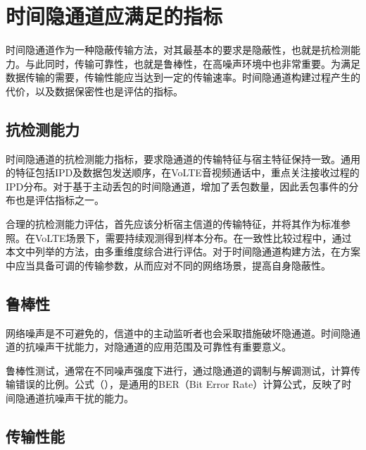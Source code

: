 \section{时间隐通道应满足的指标}
\label{chap:backinfo:metric}

时间隐通道作为一种隐蔽传输方法，对其最基本的要求是隐蔽性，也就是抗检测能力。与此同时，传输可靠性，也就是鲁棒性，在高噪声环境中也非常重要。为满足数据传输的需要，传输性能应当达到一定的传输速率。时间隐通道构建过程产生的代价，以及数据保密性也是评估的指标。

\subsection{抗检测能力}
\label{chap:backinfo:metric:undetectability}

时间隐通道的抗检测能力指标，要求隐通道的传输特征与宿主特征保持一致。通用的特征包括IPD及数据包发送顺序，在VoLTE音视频通话中，重点关注接收过程的IPD分布。对于基于主动丢包的时间隐通道，增加了丢包数量，因此丢包事件的分布也是评估指标之一。

合理的抗检测能力评估，首先应该分析宿主信道的传输特征，并将其作为标准参照。在VoLTE场景下，需要持续观测得到样本分布。在一致性比较过程中，通过本文中列举的方法，由多重维度综合进行评估。对于时间隐通道构建方法，在方案中应当具备可调的传输参数，从而应对不同的网络场景，提高自身隐蔽性。

\subsection{鲁棒性}
\label{chap:backinfo:metric:robustness}

网络噪声是不可避免的，信道中的主动监听者也会采取措施破坏隐通道。时间隐通道的抗噪声干扰能力，对隐通道的应用范围及可靠性有重要意义。


鲁棒性测试，通常在不同噪声强度下进行，通过隐通道的调制与解调测试，计算传输错误的比例。公式（），是通用的BER（Bit Error Rate）计算公式，反映了时间隐通道抗噪声干扰的能力。

\subsection{传输性能}
\label{chap:backinfo:metric:throughput}

